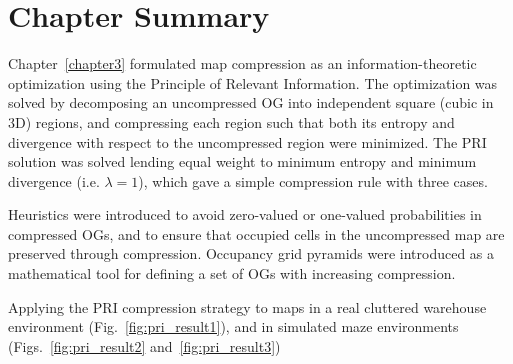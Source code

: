 \section{Chapter Summary}

Chapter~\ref{chapter3} formulated map compression as an information-theoretic
optimization using the Principle of Relevant Information. The optimization was
solved by decomposing an uncompressed OG into independent square (cubic in 3D) regions, and
compressing each region such that both its entropy and divergence with respect
to the uncompressed region were minimized. The PRI solution was solved lending equal weight
to minimum entropy and minimum divergence (i.e. $\lambda = 1$), which gave a simple
compression rule with three cases.

Heuristics were introduced to avoid zero-valued or one-valued probabilities
in compressed OGs, and to ensure that occupied cells in
the uncompressed map are preserved through compression. Occupancy grid
pyramids were introduced as a mathematical tool for defining a set of OGs with
increasing compression.

Applying the PRI compression strategy to maps in a real cluttered warehouse
environment (Fig.~\ref{fig:pri_result1}), and in simulated maze environments
(Figs.~\ref{fig:pri_result2} and~\ref{fig:pri_result3}) 


